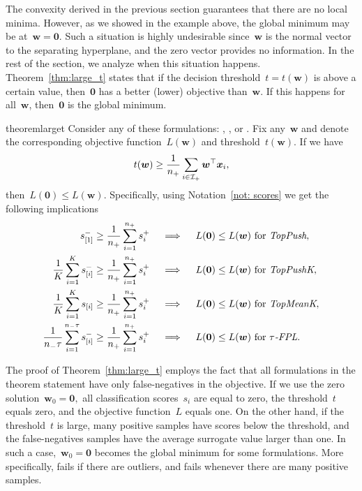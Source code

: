 The convexity derived in the previous section guarantees that there are no local minima. However, as we showed in the example above, the global minimum may be at~$\bm{w} = \bm{0}$. Such a situation is highly undesirable since~$\bm{w}$ is the normal vector to the separating hyperplane, and the zero vector provides no information. In the rest of the section, we analyze when this situation happens. Theorem~\ref{thm:large_t} states that if the decision threshold~$t = t(\bm{w})$ is above a certain value, then~$\bm{0}$ has a better (lower) objective than~$\bm{w}$. If this happens for all~$\bm{w}$, then~$\bm{0}$ is the global minimum.

\begin{restatable}{theorem}{larget}\label{thm:large_t}
  Consider any of these formulations: \TopPush, \TopPushK, \TopMeanK or \tauFPL. Fix any~$\bm{w}$ and denote the corresponding objective function~$L(\bm{w})$ and threshold~$t(\bm{w})$. If we have
  \begin{equation}\label{eq:w_zero_nn}
    t(\bm{w})\geq \frac{1}{n_{+}} \sum_{i \in \mathcal{I}_{+}} \bm{w}^{\top} \bm{x}_i,
  \end{equation}
  then~$L(\bm{0}) \leq L(\bm{w})$. Specifically, using Notation~\ref{not: scores} we get the following implications
  \begin{align*}\label{eq:w_zero}
    s_{[1]}^- \geq \frac{1}{n_{+}} \sum_{i=1}^{n_{+}} s_{i}^+ \quad
      & \implies \quad L(\bm{0}) \leq L(\bm{w}) \text{ for } \emph{TopPush}, \\
    \frac{1}{K}\sum_{i=1}^K s_{[i]}^- \geq \frac{1}{n_{+}} \sum_{i=1}^{n_{+}} s_{i}^+  \quad
      & \implies \quad L(\bm{0}) \leq L(\bm{w}) \text{ for } \emph{TopPushK}, \\
    \frac{1}{K} \sum_{i=1}^{K} s_{[i]} \geq \frac{1}{n_{+}} \sum_{i=1}^{n_{+}} s_{i}^+ \quad
      & \implies \quad L(\bm{0}) \leq L(\bm{w}) \text{ for } \emph{TopMeanK}, \\
    \frac{1}{n_{-}\tau} \sum_{i=1}^{n_{-}\tau} s_{[i]}^- \geq \frac{1}{n_{+}}\sum_{i=1}^{n_{+}} s_{i}^+ \quad
      & \implies \quad L(\bm{0}) \leq L(\bm{w}) \text{ for } {\emph{$\tau$-FPL}}. \\
  \end{align*}
\end{restatable}

The proof of Theorem~\ref{thm:large_t} employs the fact that all formulations in the theorem statement have only false-negatives in the objective. If we use the zero solution~$\bm{w}_0=\bm{0},$ all classification scores~$s_i$ are equal to zero, the threshold~$t$ equals zero, and the objective function~$L$ equals one. On the other hand, if the threshold~$t$ is large, many positive samples have scores below the threshold, and the false-negatives samples have the average surrogate value larger than one. In such a case,~$\bm{w}_0 = \bm{0}$ becomes the global minimum for some formulations. More specifically, \TopPush fails if there are outliers, and \TopMeanK fails whenever there are many positive samples.

